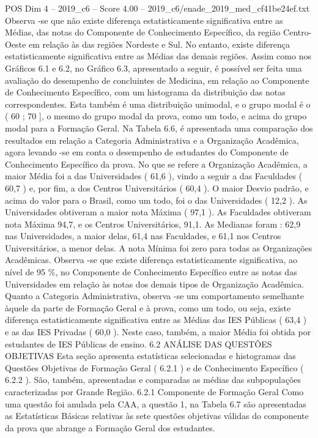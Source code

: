 \begin{textsample}{POS Dim 4 – 2019\_c6 – Score 4.00 – 2019\_c6/enade\_2019\_med\_cf41be24ef.txt}
Observa -se que não existe diferença estatisticamente significativa entre as Médias, das notas do Componente de Conhecimento Específico, da região Centro-Oeste em relação às das regiões Nordeste e Sul.
No entanto, existe diferença estatisticamente significativa entre as Médias das demais regiões.
Assim como nos Gráficos 6.1 e 6.2, no Gráfico 6.3, apresentado a seguir, é possível ser feita uma avaliação do desempenho de concluintes de Medicina, em relação ao Componente de Conhecimento Específico, com um histograma da distribuição das notas correspondentes.
Esta também é uma distribuição unimodal, e o grupo modal é o ( 60 ; 70 ], o mesmo do grupo modal da prova, como um todo, e acima do grupo modal para a Formação Geral.
Na Tabela 6.6, é apresentada uma comparação dos resultados em relação a Categoria Administrativa e a Organização Acadêmica, agora levando -se em conta o desempenho de estudantes do Componente de Conhecimento Específico da prova.
No que se refere a Organização Acadêmica, a maior Média foi a das Universidades ( 61,6 ), vindo a seguir a das Faculdades ( 60,7 ) e, por fim, a dos Centros Universitários ( 60,4 ).
O maior Desvio padrão, e acima do valor para o Brasil, como um todo, foi o das Universidades ( 12,2 ).
As Universidades obtiveram a maior nota Máxima ( 97,1 ).
As Faculdades obtiveram nota Máxima 94,7, e os Centros Universitários, 91,1.
As Medianas foram : 62,9 nas Universidades, a maior delas, 61,4 nas Faculdades, e 61,1 nos Centros Universitários, a menor delas.
A nota Mínima foi zero para todas as Organizações Acadêmicas.
Observa -se que existe diferença estatisticamente significativa, ao nível de 95 \%, no Componente de Conhecimento Específico entre as notas das Universidades em relação às notas dos demais tipos de Organização Acadêmica.
Quanto a Categoria Administrativa, observa -se um comportamento semelhante àquele da parte de Formação Geral e à prova, como um todo, ou seja, existe diferença estatisticamente significativa entre as Médias das IES Públicas ( 63,4 ) e as das IES Privadas ( 60,0 ).
Neste caso, também, a maior Média foi obtida por estudantes de IES Públicas de ensino. 6.2 ANÁLISE DAS QUESTÕES OBJETIVAS Esta seção apresenta estatísticas selecionadas e histogramas das Questões Objetivas de Formação Geral ( 6.2.1 ) e de Conhecimento Específico ( 6.2.2 ).
São, também, apresentadas e comparadas as médias das subpopulações caracterizadas por Grande Região. 6.2.1 Componente de Formação Geral Como uma questão foi anulada pela CAA, a questão 1, na Tabela 6.7 são apresentadas as Estatísticas Básicas relativas às sete questões objetivas válidas do componente da prova que abrange a Formação Geral dos estudantes.

\end{textsample}
